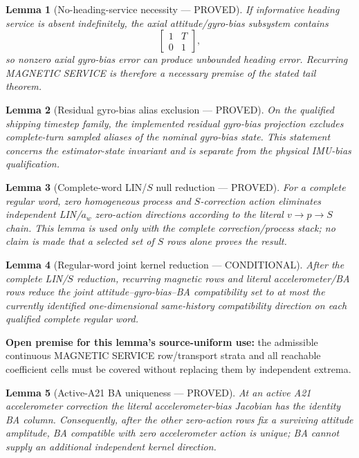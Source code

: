 \documentclass[journal]{IEEEtran}
\newtheorem{lemma}{Lemma}\newtheorem{theorem}{Theorem}\newtheorem{proposition}{Proposition}\newtheorem{remark}{Remark}\newtheorem{corollary}{Corollary}
\begin{document}
\begin{lemma}[No-heading-service necessity --- PROVED]
If informative heading service is absent indefinitely, the axial attitude/gyro-bias subsystem contains
\[
\begin{bmatrix}1&T\\0&1\end{bmatrix},
\]
so nonzero axial gyro-bias error can produce unbounded heading error.  Recurring MAGNETIC SERVICE is therefore a necessary premise of the stated tail theorem.
\end{lemma}

\begin{lemma}[Residual gyro-bias alias exclusion --- PROVED]
On the qualified shipping timestep family, the implemented residual gyro-bias projection excludes complete-turn sampled aliases of the nominal gyro-bias state.  This statement concerns the estimator-state invariant and is separate from the physical IMU-bias qualification.
\end{lemma}

\begin{lemma}[Complete-word LIN/\(S\) null reduction --- PROVED]
For a complete regular word, zero homogeneous process and \(S\)-correction action eliminates independent LIN/\(a_w\) zero-action directions according to the literal \(v\to p\to S\) chain.  This lemma is used only with the complete correction/process stack; no claim is made that a selected set of \(S\) rows alone proves the result.
\end{lemma}

\begin{lemma}[Regular-word joint kernel reduction --- CONDITIONAL]
After the complete LIN/\(S\) reduction, recurring magnetic rows and literal accelerometer/BA rows reduce the joint attitude--gyro-bias--BA compatibility set to at most the currently identified one-dimensional same-history compatibility direction on each qualified complete regular word.
\end{lemma}
\noindent\textbf{Open premise for this lemma's source-uniform use:} the admissible continuous MAGNETIC SERVICE row/transport strata and all reachable coefficient cells must be covered without replacing them by independent extrema.

\begin{lemma}[Active-A21 BA uniqueness --- PROVED]
At an active A21 accelerometer correction the literal accelerometer-bias Jacobian has the identity BA column.  Consequently, after the other zero-action rows fix a surviving attitude amplitude, BA compatible with zero accelerometer action is unique; BA cannot supply an additional independent kernel direction.
\end{lemma}
\end{document}
